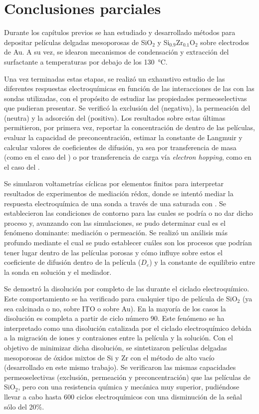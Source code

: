 \section{Conclusiones parciales}
	
	Durante los capítulos previos se han estudiado y desarrollado métodos para depositar películas delgadas mesoporosas de SiO$_2$ y Si$_{0.9}$Zr$_{0.1}$O$_2$  sobre electrodos de Au. A su vez, se idearon mecanismos de condensación y extracción del surfactante a temperaturas por debajo de los \SI{130}{\celsius}. 

	Una vez terminadas estas etapas, se realizó un exhaustivo estudio de las diferentes respuestas electroquímicas en función de las interacciones de las \pdm\space con las sondas utilizadas, con el propósito de estudiar las propiedades permeoselectivas que pudieran presentar. Se verificó la exclusión del \ferroferri\space (negativa), la permeación del \fc\space (neutra) y la adsorción del \aminorutenio\space (positiva). Los resultados sobre estas últimas permitieron, por primera vez, reportar la concentración de \ru\space dentro de las películas, evaluar la capacidad de preconcentración, estimar la constante de Langmuir y calcular valores de coeficientes de difusión, ya sea por transferencia de masa (como en el caso del \fc) o por transferencia de carga vía \textit{electron hopping}, como en el caso del \ru.

	Se simularon voltametrías cíclicas por elementos finitos para interpretar resultados de experimentos de mediación rédox, donde se intentó mediar la respuesta electroquímica de una sonda a través de una \pdm\space saturada con \ru. Se establecieron las condiciones de contorno para las cuales se podría o no dar dicho proceso y, avanzando con las simulaciones, se pudo determinar cual es el fenómeno dominante: mediación o permeación. Se realizó un análisis más profundo mediante el cual se pudo establecer cuáles son los procesos que podrían tener lugar dentro de las películas porosas y cómo influye sobre estos el coeficiente de difusión dentro de la película ($D_e$) y la constante de equilibrio entre la sonda en solución y el mediador.

	Se demostró la disolución por completo de las \pdmF\space durante el ciclado electroquímico. Este comportamiento se ha verificado para cualquier tipo de película de SiO$_2$ (ya sea calcinada o no, sobre ITO o sobre Au). En la mayoría de los casos la disolución es completa a partir de ciclo número 90. Este fenómeno se ha interpretado como una disolución catalizada por el ciclado electroquímico debida a la migración de iones y contraiones entre la película y la solución. Con el objetivo de minimizar dicha disolución, se sintetizaron películas delgadas mesoporosas de óxidos mixtos de Si y Zr con el método de alto vacío (desarrollado en este mismo trabajo). Se verificaron las mismas capacidades permeoselectivas (exclusión, permeación y preconcentración) que las películas de SiO$_2$, pero con una resistencia química y mecánica muy superior, pudiéndose llevar a cabo hasta 600 ciclos electroquímicos con una disminución de la señal sólo del 20\%.

